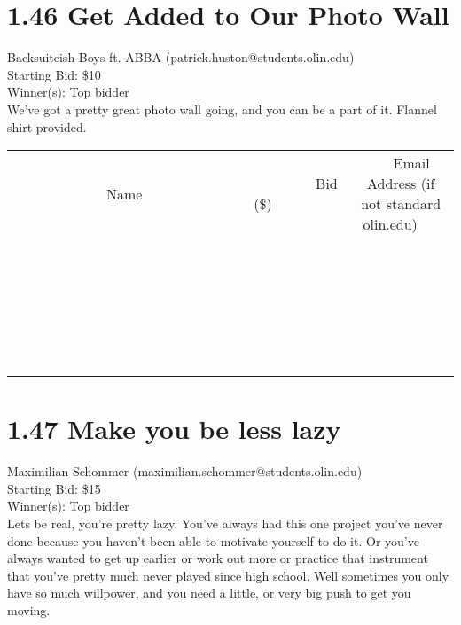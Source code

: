 \documentclass[11pt]{article}
\begin{document}
\section*{1.46 Get Added to Our Photo Wall}
Backsuiteish Boys ft. ABBA (patrick.huston@students.olin.edu) \\
Starting Bid: \$10 \\
Winner(s): 
Top bidder \\
We've got a pretty great photo wall going, and you can be a part of it. Flannel shirt provided. \\[6ex]
\begin{tabular}{c c c}
~~~~~~~~~~~~~Name~~~~~~~~~~~~~ & ~~~~~~~~~Bid (\$)~~~~~~~~~ & ~~~Email Address (if not standard olin.edu)~~~ \\
 & & \\
\hline
 & & \\
\hline
 & & \\
\hline
 & & \\
\hline
 & & \\
\hline
 & & \\
\hline
 & & \\
\hline
 & & \\
\hline
 & & \\
\hline
 & & \\
\hline
 & & \\
\hline
 & & \\
\hline
 & & \\
\hline
 & & \\
\hline
 & & \\
\hline
 & & \\
\hline
 & & \\
\hline
 & & \\
\hline
 & & \\
\hline
 & & \\
\hline
 & & \\
\hline
 & & \\
\hline
 & & \\
\hline
 & & \\
\hline
 & & \\
\hline
 & & \\
\hline
\end{tabular}
\clearpage
\section*{1.47 Make you be less lazy}
Maximilian Schommer (maximilian.schommer@students.olin.edu) \\
Starting Bid: \$15 \\
Winner(s): 
Top bidder \\
Lets be real, you're pretty lazy. You've always had this one project you've never done because you haven't been able to motivate yourself to do it. Or you've always wanted to get up earlier or work out more or practice that instrument that you've pretty much never played since high school. Well sometimes you only have so much willpower, and you need a little, or very big push to get you moving. 
\end{document}
